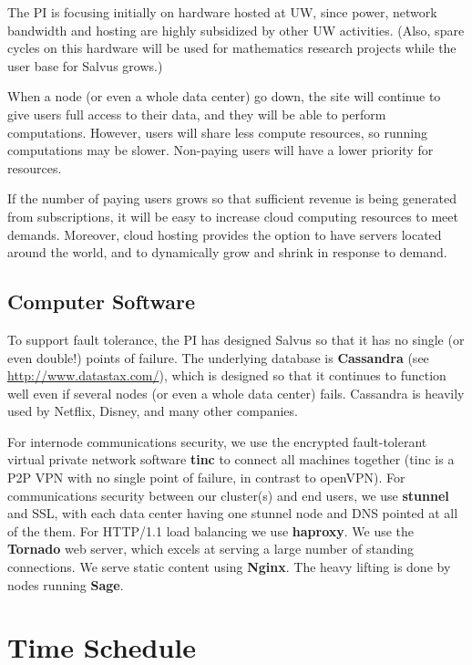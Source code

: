 \documentclass[11pt]{article}
\begin{document}
The PI is focusing initially on hardware hosted at UW, since power,
network bandwidth and hosting are highly subsidized by other UW
activities.  (Also, spare cycles on this hardware will be used for
mathematics research projects while the user base for Salvus grows.)

When a node (or even a whole data center) go down, the site will
continue to give users full access to their data, and they will be
able to perform computations.  However, users will share less compute
resources, so running computations may be slower.  Non-paying users
will have a lower priority for resources.

If the number of paying users grows so that sufficient revenue is
being generated from subscriptions, it will be easy to increase cloud
computing resources to meet demands.  Moreover, cloud
hosting provides the option to have servers located around the world,
and to dynamically grow and shrink in response to demand.

\subsection{Computer Software}

To support fault tolerance, the PI has designed Salvus so that it has
no single (or even double!) points of failure.  The underlying
database is {\bf Cassandra} (see \url{http://www.datastax.com/}),
which is designed so that it continues to function well even if
several nodes (or even a whole data center) fails.  Cassandra is
heavily used by Netflix, Disney, and many other companies.

For internode communications security, we use the encrypted
fault-tolerant virtual private network software {\bf tinc} to connect
all machines together (tinc is a P2P VPN with no single
point of failure, in contrast to openVPN).  For communications
security between our cluster(s) and end users, we use {\bf stunnel}
and SSL, with each data center having one stunnel node and DNS pointed
at all of the them.  For HTTP/1.1 load balancing we use {\bf haproxy}.
We use the {\bf Tornado} web server, which excels at serving a large
number of standing connections.  We serve static content using {\bf
  Nginx}.  The heavy lifting is done by nodes
running {\bf Sage}.


\section{Time Schedule}
\end{document}
